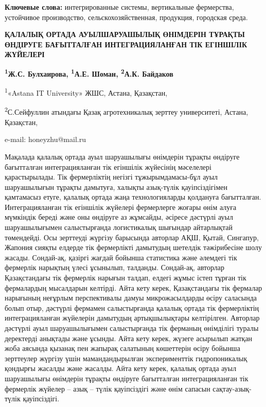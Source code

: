 {\bfseries Ключевые слова:} интегрированные системы, вертикальные
фермерства, устойчивое производство, сельскохозяйственная, продукция,
городская среда.

\begin{articleheader}
{\bfseries ҚАЛАЛЫҚ ОРТАДА АУЫЛШАРУАШЫЛЫҚ ӨНІМДЕРІН ТҰРАҚТЫ ӨНДІРУГЕ БАҒЫТТАЛҒАН ИНТЕГРАЦИЯЛАНҒАН ТІК ЕГІНШІЛІК ЖҮЙЕЛЕРІ}

{\bfseries
\textsuperscript{1}Ж.С. Булхаирова\textsuperscript{\envelope },
\textsuperscript{1}А.Е. Шоман,
\textsuperscript{2}А.К. Байдаков
}
\end{articleheader}

\begin{affiliation}
\textsuperscript{1}«Astana IT University» ЖШС, Астана, Қазақстан,

\textsuperscript{2}С.Сейфуллин атындағы Қазақ агротехникалық зерттеу университеті, Астана, Қазақстан,

e-mail: honeyzhu@mail.ru
\end{affiliation}

Мақалада қалалық ортада ауыл шаруашылығы өнімдерін тұрақты өндіруге
бағытталған интеграцияланған тік егіншілік жүйесінің мәселелері
қарастырылады. Тік фермерліктің негізгі тұжырымда\-масы-бұл ауыл
шаруашылығын тұрақты дамытуға, халықты азық-түлік қауіпсіздігімен
қамтамасыз етуге, қалалық ортада жаңа технологияларды қолдануға
бағытталған. Интеграцияланған тік егіншілік жүйелері фермерлерге жоғары
өнім алуға мүмкіндік береді және оны өндіруге аз жұмсайды, әсіресе
дәстүрлі ауыл шаруашылығымен салыстырғанда логистикалық шығындар
айтарлықтай төмендейді. Осы зерттеуді жүргізу барысында авторлар АҚШ,
Қытай, Сингапур, Жапония сияқты елдерде тік фермерлікті дамытудың
шетелдік тәжірибесіне шолу жасады. Сондай-ақ, қазіргі жағдай бойынша
статистика және әлемдегі тік фермерлік нарықтың үлесі ұсынылып,
талданды. Сондай-ақ, авторлар Қазақстандағы тік фермерлік нарығын
талдап, елдегі жұмыс істеп тұрған тік фермалардың мысалдарын келтірді.
Айта кету керек, Қазақстандағы тік фермалар нарығының неғұрлым
перспективалы дамуы микрожасылдарды өсіру саласында болып отыр, дәстүрлі
фермамен салыстырғанда қалалық ортада тік фермерліктің интеграцияланған
жүйелерін дамытудың артықшылықтары келтірілген. Авторлар дәстүрлі ауыл
шаруашылығымен салыстырғанда тік ферманың өнімділігі туралы деректерді
анықтады және ұсынды. Айта кету керек, жүзеге асырылып жатқан жоба
аясында қызанақ пен жапырақ салатының көшеттерін өсіру бойынша
зерттеулер жүргізу үшін мамандандырылған эксперименттік гидропоникалық
қондырғы жасалды және жасалды. Айта кету керек, қалалық ортада ауыл
шаруашылығы өнімдерін тұрақты өндіруге бағытталған интеграцияланған тік
фермерлік жүйелер -- азық -- түлік қауіпсіздігі және өнім сапасын
сақтау-азық-түлік қауіпсіздігі.

